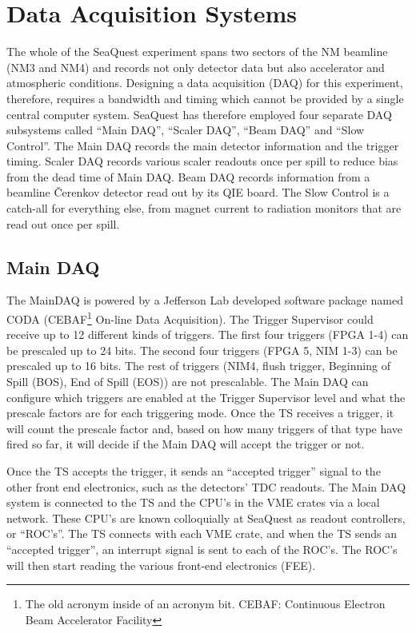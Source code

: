 \section{Data Acquisition Systems}


The whole of the SeaQuest experiment spans two sectors of the NM beamline (NM3 and NM4) and records not only detector data but also accelerator and atmospheric conditions. Designing a data acquisition (DAQ) for this experiment, therefore, requires a bandwidth and timing which cannot be provided by a single central computer system. SeaQuest has therefore employed four separate DAQ subsystems called ``Main DAQ'', ``Scaler DAQ'', ``Beam DAQ'' and ``Slow Control''. The Main DAQ records the main detector information and the trigger timing. Scaler DAQ records various scaler readouts once per spill to reduce bias from the dead time of Main DAQ. Beam DAQ records information from a beamline \v{C}erenkov detector read out by its QIE board. The Slow Control is a catch-all for everything else, from magnet current to radiation monitors that are read out once per spill.

\subsection{Main DAQ}

The MainDAQ is powered by a Jefferson Lab developed software package named CODA (CEBAF\footnote{The old acronym inside of an acronym bit. CEBAF: Continuous Electron Beam Accelerator Facility} On-line Data Acquisition). The Trigger Supervisor could receive up to 12 different kinds of triggers. The first four triggers (FPGA 1-4) can be prescaled up to 24 bits. The second four triggers (FPGA 5, NIM 1-3) can be prescaled up to 16 bits. The rest of triggers (NIM4, flush trigger, Beginning of Spill (BOS), End of Spill (EOS)) are not prescalable. The Main DAQ can configure which triggers are enabled at the Trigger Supervisor level and what the  prescale factors are for each triggering mode. Once the TS receives a trigger, it will count the prescale factor and, based on how many triggers of that type have fired so far, it will decide if the Main DAQ will accept the trigger or not. 

Once the TS accepts the trigger, it sends an ``accepted trigger'' signal to the other front end electronics, such as the detectors' TDC readouts. The Main DAQ system is connected to the TS and the CPU's in the VME crates via a local network. These CPU's are known colloquially at SeaQuest as readout controllers, or ``ROC's''. The TS connects with each VME crate, and when the TS sends an ``accepted trigger'', an interrupt signal is sent to each of the ROC's. The ROC's will then start reading the various front-end electronics (FEE).

